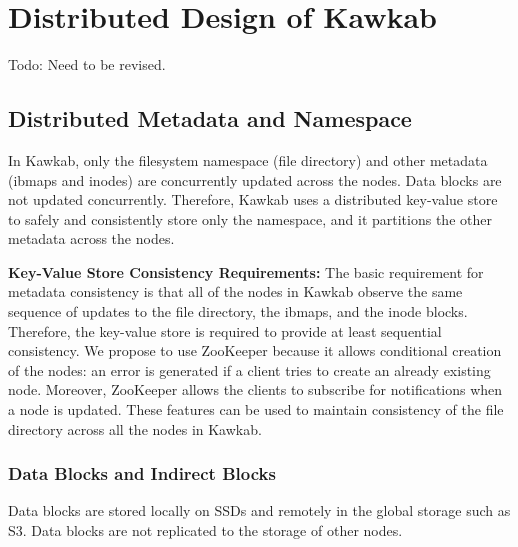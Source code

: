 \documentclass[]{article}
\newcommand{\subtopic}[1]{\vspace{1.5pt} \noindent \textbf{#1}}
\newcommand{\hl}[1]{\textcolor{hlcolor}{#1}}
\begin{document}
%



\section{Distributed Design of Kawkab}

\hl{Todo: Need to be revised.}

\subsection{Distributed Metadata and Namespace}

In Kawkab, only the filesystem namespace (file directory) and other metadata
(ibmaps and inodes) are concurrently updated across the nodes. Data blocks are
not updated concurrently. Therefore, Kawkab uses a distributed key-value store
to safely and consistently store only the namespace, and it partitions the 
other metadata across the nodes.

\subtopic{Key-Value Store Consistency Requirements:} The basic requirement for
metadata consistency is that all of the nodes in Kawkab observe the same
sequence of updates to the file directory, the ibmaps, and the inode blocks.  
Therefore, the key-value store is required to provide at least sequential
consistency.
We propose to use ZooKeeper because it allows conditional creation of the
nodes: an error is generated if a client tries to create an already existing
node. Moreover, ZooKeeper allows the clients to subscribe for notifications
when a node is updated.  These features can be used to maintain consistency
of the file directory across all the nodes in Kawkab.


\subsubsection{Data Blocks and Indirect Blocks} Data blocks are stored locally
on SSDs and remotely in the global storage such as S3. Data blocks are
not replicated to the storage of other nodes.
\end{document}
